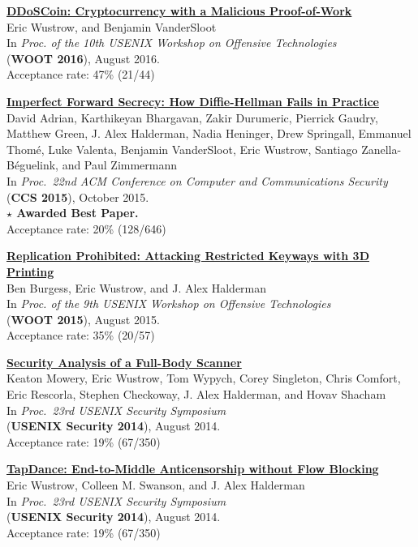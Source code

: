 \documentclass[margin,11pt]{res} %
\begin{document}
    \textbf{\href{https://github.com/ewust/DDoSCoin}{DDoSCoin: Cryptocurrency with a Malicious Proof-of-Work}} \\
    Eric Wustrow, and Benjamin VanderSloot \\
    In \emph{Proc. of the 10th USENIX Workshop on Offensive Technologies} \\
    (\textbf{WOOT 2016}), August 2016. \\
    Acceptance rate: 47\% (21/44)

    \textbf{\href{https://weakdh.org/}{Imperfect Forward Secrecy: How Diffie-Hellman Fails in Practice}} \\
    David Adrian, Karthikeyan Bhargavan, Zakir Durumeric, Pierrick Gaudry, Matthew Green,
    J. Alex Halderman, Nadia Heninger, Drew Springall, Emmanuel Thom\'e, Luke Valenta,
    Benjamin VanderSloot, Eric Wustrow, Santiago Zanella-B\'eguelink, and Paul Zimmermann \\
    In \emph{Proc.\ 22nd ACM Conference on Computer and Communications Security} \\
    (\textbf{CCS 2015}), October 2015. \\
    \textbf{$\star$ Awarded Best Paper.} \\
    Acceptance rate: 20\% (128/646)

    \textbf{\href{https://keysforge.com/}{Replication Prohibited: Attacking Restricted Keyways with 3D Printing}} \\
    Ben Burgess, Eric Wustrow, and J. Alex Halderman \\
    In \emph{Proc. of the 9th USENIX Workshop on Offensive Technologies} \\
    (\textbf{WOOT 2015}), August 2015. \\
    Acceptance rate: 35\% (20/57)

    \textbf{\href{https://www.radsec.org/paper.html}{Security Analysis of a Full-Body Scanner}} \\
    Keaton Mowery, Eric Wustrow, Tom Wypych, Corey Singleton, Chris Comfort, Eric Rescorla, Stephen Checkoway, J. Alex Halderman, and Hovav Shacham \\
    In \emph{Proc.\ 23rd USENIX Security Symposium} \\
    (\textbf{USENIX Security 2014}), August 2014. \\
    Acceptance rate: 19\% (67/350)

    \textbf{\href{https://jhalderm.com/pub/papers/tapdance-sec14.pdf}{TapDance: End-to-Middle Anticensorship without Flow Blocking}} \\
    Eric Wustrow, Colleen M. Swanson, and J. Alex Halderman \\
    In \emph{Proc.\ 23rd USENIX Security Symposium} \\
    (\textbf{USENIX Security 2014}), August 2014. \\
    Acceptance rate: 19\% (67/350)
\end{document}
